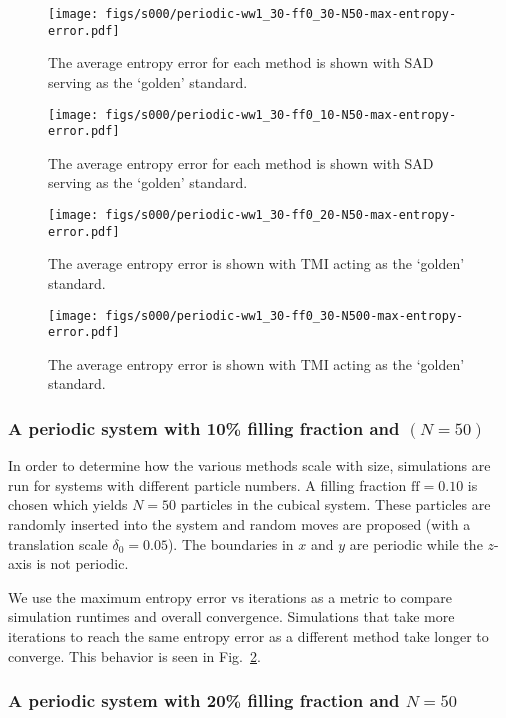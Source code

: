 \documentclass[letterpaper,twocolumn,amsmath,amssymb,pre,aps,10pt]{revtex4-1}
\begin{document}
\begin{figure}
  \texttt{[image: figs/s000/periodic-ww1\_30-ff0\_30-N50-max-entropy-error.pdf]}
  \caption{The average entropy error for each method is shown with
  SAD serving as the `golden'
  standard.}\label{fig:N50-ff0.3-max-error}
\end{figure}
\begin{figure}
  \texttt{[image: figs/s000/periodic-ww1\_30-ff0\_10-N50-max-entropy-error.pdf]}
  \caption{The average entropy error for each method is shown with SAD serving as
  the `golden' standard.}\label{fig:N50-ff0.1-max-error}
\end{figure}
\begin{figure}
  \texttt{[image: figs/s000/periodic-ww1\_30-ff0\_20-N50-max-entropy-error.pdf]}
  \caption{The average entropy error is shown with TMI acting as the
  `golden' standard.}\label{fig:N50-ff0.2-max-error}
\end{figure}
\begin{figure}
\texttt{[image: figs/s000/periodic-ww1\_30-ff0\_30-N500-max-entropy-error.pdf]}
  \caption{The average entropy error is shown with TMI acting as the
  `golden' standard.}
\end{figure}

\subsubsection{A periodic system with 10\% filling fraction and $(N = 50)$}
In order to determine how the various methods scale with size,
simulations are run for systems with different particle numbers. A filling
fraction $\text{ff} = 0.10$ is chosen which yields $N = 50$ particles
in the cubical system.  These particles are randomly inserted into the
system and random moves are proposed (with a translation scale
$\delta_0 = 0.05$). The boundaries in $x$ and $y$ are periodic while
the $z$-axis is not periodic.

We use the maximum entropy error vs iterations as a metric to compare
simulation runtimes and overall convergence.  Simulations that take
more iterations to reach the same entropy error as a different method
take longer to converge. This behavior is seen in
Fig.~\ref{fig:N50-ff0.1-max-error}.

\subsubsection{A periodic system with 20\% filling fraction and $N = 50$}
\end{document}

